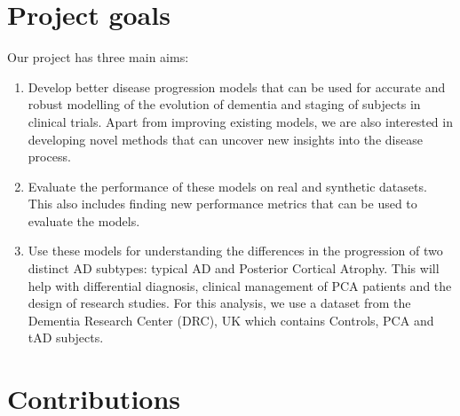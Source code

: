 \section{Project goals}

Our project has three main aims:
\begin{enumerate}
 \item Develop better disease progression models that can be used for accurate and robust modelling of the evolution of dementia and staging of subjects in clinical trials. Apart from improving existing models, we are also interested in developing novel methods that can uncover new insights into the disease process. 
 \item Evaluate the performance of these models on real and synthetic datasets. This also includes finding new performance metrics that can be used to evaluate the models. 
 \item Use these models for understanding the differences in the progression of two distinct AD subtypes: typical AD and Posterior Cortical Atrophy. This will help with differential diagnosis, clinical management of PCA patients and the design of research studies. For this analysis, we use a dataset from the Dementia Research Center (DRC), UK which contains Controls, PCA and tAD subjects. 
\end{enumerate}

\section{Contributions}

